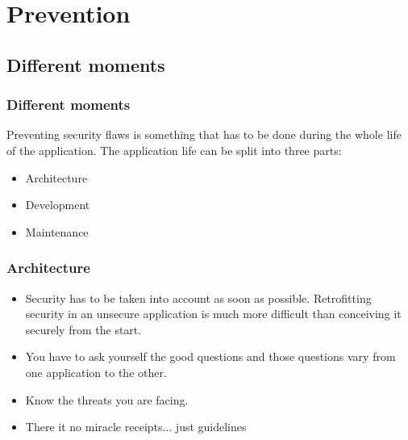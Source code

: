 \section{Prevention}

\begin{frame}
\sectionpage
\end{frame}

\subsection{Different moments}

\begin{frame}
\frametitle{Different moments}

Preventing security flaws is something that has to be done during the
whole life of the application. The application life can be split into
three parts:

\begin{itemize}
\item Architecture
\item Development
\item Maintenance
\end{itemize}
\end{frame}

\begin{frame}
\frametitle{Architecture}
\begin{itemize}
\item Security has to be taken into account as soon as
  possible. Retrofitting security in an unsecure application is much
  more difficult than conceiving it securely from the start.
\item You have to ask yourself the good questions and those questions
  vary from one application to the other.
\item Know the threats you are facing.
\item There it no miracle receipts... just guidelines
\end{itemize}
\end{frame}

